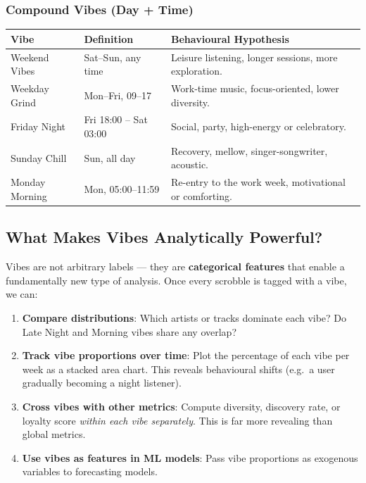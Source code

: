 \documentclass[12pt, a4paper]{article}
\begin{document}
\subsubsection{Compound Vibes (Day + Time)}

\begin{center}
\begin{tabular}{llp{6.5cm}}
    \toprule
    \textbf{Vibe} & \textbf{Definition} & \textbf{Behavioural Hypothesis} \\
    \midrule
    Weekend Vibes   & Sat--Sun, any time  & Leisure listening, longer
                                            sessions, more exploration. \\
    Weekday Grind   & Mon--Fri, 09--17    & Work-time music, focus-oriented,
                                            lower diversity. \\
    Friday Night     & Fri 18:00 -- Sat 03:00 & Social, party, high-energy
                                                or celebratory. \\
    Sunday Chill     & Sun, all day        & Recovery, mellow, singer-songwriter,
                                            acoustic. \\
    Monday Morning   & Mon, 05:00--11:59   & Re-entry to the work week,
                                            motivational or comforting. \\
    \bottomrule
\end{tabular}
\end{center}

\subsection{What Makes Vibes Analytically Powerful?}

Vibes are not arbitrary labels --- they are \textbf{categorical features}
that enable a fundamentally new type of analysis. Once every scrobble is
tagged with a vibe, we can:

\begin{enumerate}
    \item \textbf{Compare distributions}: Which artists or tracks dominate
          each vibe? Do Late Night and Morning vibes share any overlap?
    \item \textbf{Track vibe proportions over time}: Plot the percentage of
          each vibe per week as a stacked area chart. This reveals
          behavioural shifts (e.g.\ a user gradually becoming a night
          listener).
    \item \textbf{Cross vibes with other metrics}: Compute diversity,
          discovery rate, or loyalty score \emph{within each vibe
          separately}. This is far more revealing than global metrics.
    \item \textbf{Use vibes as features in ML models}: Pass vibe proportions
          as exogenous variables to forecasting models.
\end{enumerate}
\end{document}
